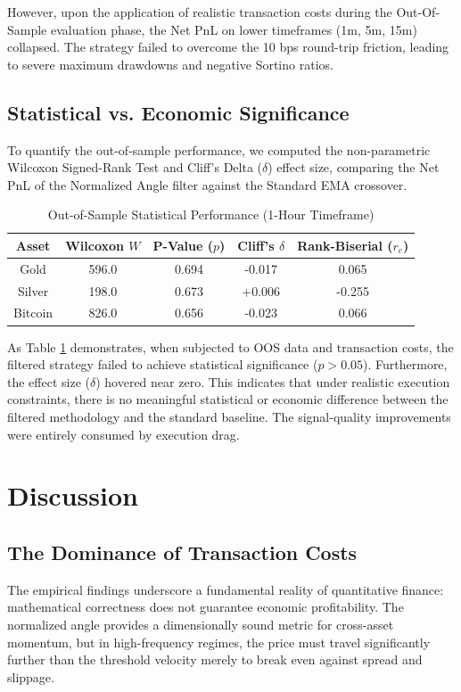 \documentclass[conference]{IEEEtran}
\begin{document}
However, upon the application of realistic transaction costs during the Out-Of-Sample evaluation phase, the Net PnL on lower timeframes (1m, 5m, 15m) collapsed. The strategy failed to overcome the 10 bps round-trip friction, leading to severe maximum drawdowns and negative Sortino ratios.

\subsection{Statistical vs. Economic Significance}
To quantify the out-of-sample performance, we computed the non-parametric Wilcoxon Signed-Rank Test and Cliff's Delta ($\delta$) effect size, comparing the Net PnL of the Normalized Angle filter against the Standard EMA crossover.

\begin{table}[htbp]
\caption{Out-of-Sample Statistical Performance (1-Hour Timeframe)}
\begin{center}
\begin{tabular}{|c|c|c|c|c|}
\hline
\textbf{Asset} & \textbf{Wilcoxon $W$} & \textbf{P-Value ($p$)} & \textbf{Cliff's $\delta$} & \textbf{Rank-Biserial ($r_c$)} \\
\hline
Gold & 596.0 & 0.694 & -0.017 & 0.065 \\
Silver & 198.0 & 0.673 & +0.006 & -0.255 \\
Bitcoin & 826.0 & 0.656 & -0.023 & 0.066 \\
\hline
\end{tabular}
\label{tab1}
\end{center}
\end{table}

As Table \ref{tab1} demonstrates, when subjected to OOS data and transaction costs, the filtered strategy failed to achieve statistical significance ($p > 0.05$). Furthermore, the effect size ($\delta$) hovered near zero. This indicates that under realistic execution constraints, there is no meaningful statistical or economic difference between the filtered methodology and the standard baseline. The signal-quality improvements were entirely consumed by execution drag.

\section{Discussion}
\subsection{The Dominance of Transaction Costs}
The empirical findings underscore a fundamental reality of quantitative finance: mathematical correctness does not guarantee economic profitability. The normalized angle provides a dimensionally sound metric for cross-asset momentum, but in high-frequency regimes, the price must travel significantly further than the threshold velocity merely to break even against spread and slippage.
\end{document}
